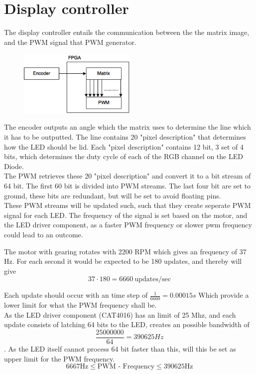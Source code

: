 \section{Display controller}
The display controller entails the communication between the the matrix image, and the PWM signal that PWM generator. 


\begin{figure}[H]
	\center
	\includegraphics[width = 0.5\textwidth]{images/Image_controller_setup.png}
	\caption{}
	\label{fig:Image_controller_setup}
\end{figure}

The encoder outputs an angle which the matrix uses to determine the line which it has to be outputted.  The line contains 20 "pixel description" that determines how the LED should be lid.  Each "pixel description" contains 12 bit, 3 set of 4 bits, which determines the duty cycle of each of the RGB channel on the LED Diode.  \\

The PWM retrieves these 20 "pixel description" and convert it to a bit stream of 64 bit.  
The first 60 bit is divided into PWM streams. The last four bit are set to ground,  these bits are redundant, but will be set to avoid floating pins. \\

These PWM streams will be updated such, such that they create seperate PWM signal for each LED.  The frequency of the signal is set based on the motor, and the LED driver component, as a faster PWM frequency or slower pwm frequency could lead to an outcome. 

The motor with gearing rotates with 2200 RPM which gives an frequency of 37 Hz.	
For each second it would be expected to be 180 updates, and thereby will give 
$$37 \cdot 180 = 6660 ~\text{updates/sec}$$

Each update should occur with an time step of $\frac{1}{6660} = 0.00015s$ Which provide a lower limit for what the PWM frequency shall be.  \\

As the LED driver component (CAT4016) has an limit of 25 Mhz, and each update consists of latching  64 bits to the LED,  creates an possible bandwidth of $$\frac{25000000}{64} =  390625 Hz$$. As the LED itself cannot process 64 bit faster than this, will this be set as upper limit for the PWM frequency.    
$$6667 \text{Hz}  \leq \text{PWM - Frequency}  \leq 390625 \text{Hz}  $$

